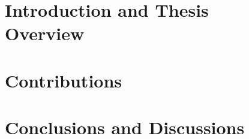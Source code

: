 %
%
%






\setlength{\parindent}{0pt}
\setlength{\parskip}{0pt} %
\frontmatter


\setcounter{page}{0}




\cleardoublepage
{}
\tableofcontents

% 


\setlength{\parskip}{1em}


\mainmatter
\cleardoublepage
\part{Introduction and Thesis Overview~~~}

\cleardoublepage
\part{Contributions~~~}



\cleardoublepage
\part{Conclusions and Discussions~~~}

\cleardoublepage
{}

\backmatter




